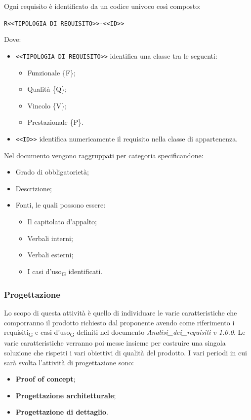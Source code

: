     Ogni requisito è identificato da un codice univoco così composto:
    \begin{center}
		\verb|R<<TIPOLOGIA DI REQUISITO>>-<<ID>>|
    \end{center}
    Dove:
    \begin{itemize}
        \item \verb|<<TIPOLOGIA DI REQUISITO>>| identifica una classe tra le seguenti:
        \begin{itemize}
            \item Funzionale \{F\};
            \item Qualità \{Q\};
            \item Vincolo \{V\};
            \item Prestazionale \{P\}.
        \end{itemize}
        \item \verb|<<ID>>| identifica numericamente il requisito nella classe di appartenenza.
    \end{itemize}
    Nel documento vengono raggruppati per categoria specificandone:
    \begin{itemize}
        \item Grado di obbligatorietà;
        \item Descrizione;
        \item Fonti, le quali possono essere:
        \begin{itemize}
        	\item Il capitolato d'appalto;
        	\item Verbali interni;
        	\item Verbali esterni;
        	\item I casi d'uso\textsubscript{G} identificati.
        \end{itemize}
    \end{itemize}
	
	
	\subsubsection{Progettazione}
	Lo scopo di questa attività è quello di individuare le varie caratteristiche che comporranno il prodotto richiesto dal proponente avendo come riferimento i requisiti\textsubscript{G} e casi d'uso\textsubscript{G} definiti nel documento \textit{Analisi\_dei\_requisiti v 1.0.0}. Le varie caratteristiche verranno poi messe insieme per costruire una singola soluzione che rispetti i vari obiettivi di qualità del prodotto.
	I vari periodi in cui sarà svolta l'attività di progettazione sono:
	\begin{itemize}
		\item \textbf{Proof of concept};
		\item \textbf{Progettazione architetturale};
		\item \textbf{Progettazione di dettaglio}.
	\end{itemize}
